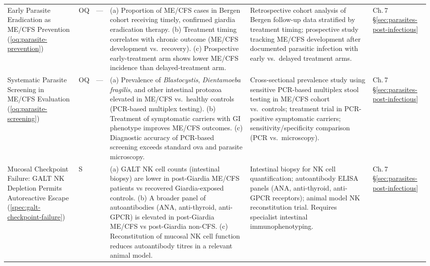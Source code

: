 \begin{longtable}{%
  p{3.0cm}
  >{\centering\arraybackslash}p{0.55cm}
  >{\centering\arraybackslash}p{1.0cm}
  p{3.8cm}
  p{3.8cm}
  p{2.2cm}
}
Early Parasite Eradication as ME/CFS Prevention
(\ref{oq:parasite-prevention})
&
OQ & ---
&
(a) Proportion of ME/CFS cases in Bergen cohort receiving timely, confirmed
giardia eradication therapy.
(b) Treatment timing correlates with chronic outcome (ME/CFS development vs.\ recovery).
(c) Prospective early-treatment arm shows lower ME/CFS incidence than delayed-treatment arm.
&
Retrospective cohort analysis of Bergen follow-up data stratified by treatment timing;
prospective study tracking ME/CFS development after documented parasitic infection
with early vs.\ delayed treatment arms.
&
Ch.\,7 \S\ref{sec:parasites-post-infectious} \\[6pt]

Systematic Parasite Screening in ME/CFS Evaluation
(\ref{oq:parasite-screening})
&
OQ & ---
&
(a) Prevalence of \textit{Blastocystis}, \textit{Dientamoeba fragilis}, and other
intestinal protozoa elevated in ME/CFS vs.\ healthy controls (PCR-based multiplex testing).
(b) Treatment of symptomatic carriers with GI phenotype improves ME/CFS outcomes.
(c) Diagnostic accuracy of PCR-based screening exceeds standard ova and parasite microscopy.
&
Cross-sectional prevalence study using sensitive PCR-based multiplex stool testing
in ME/CFS cohort vs.\ controls; treatment trial in PCR-positive symptomatic carriers;
sensitivity/specificity comparison (PCR vs.\ microscopy).
&
Ch.\,7 \S\ref{sec:parasites-post-infectious} \\[6pt]

Mucosal Checkpoint Failure: GALT NK Depletion Permits Autoreactive Escape
(\ref{spec:galt-checkpoint-failure})
&
S & 0.20
&
(a) GALT NK cell counts (intestinal biopsy) are lower in post-Giardia ME/CFS
patients vs recovered Giardia-exposed controls.
(b) A broader panel of autoantibodies (ANA, anti-thyroid, anti-GPCR) is
elevated in post-Giardia ME/CFS vs post-Giardia non-CFS.
(c) Reconstitution of mucosal NK cell function reduces autoantibody titres
in a relevant animal model.
&
Intestinal biopsy for NK cell quantification; autoantibody ELISA panels
(ANA, anti-thyroid, anti-GPCR receptors); animal model NK reconstitution
trial. Requires specialist intestinal immunophenotyping.
&
Ch.\,7 \S\ref{sec:parasites-post-infectious} \\[6pt]


\end{longtable}
